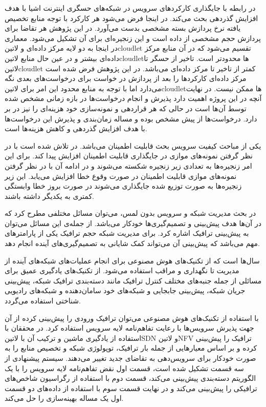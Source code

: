  در رابطه با جایگذاری کارکردهای سرویس در شبکه‌های حسگری اینترنت اشیا با هدف افزایش گذردهی بحث می‌کند. در اینجا فرض می‌شود هر کارکرد با توجه منابع تخصیص یافته نرخ پردازش بسته مشخصی بدست می‌آورد.
در این پژوهش هر تقاضا برای پردازش حجم مشخصی از داده است و این زنجیره‌ای برای آن تشکیل می‌شود. معماری در اینجا به دو لایه مرکز داده‌ای و ‌لاتین{cloudlet} تقسیم می‌شود که در آن منابع مرکز داده‌ای بیشتر
و در عین حال منابع ‌لاتین{cloudlet}ها محدودتر است. تاخیر از حسگر تا ‌لاتین{cloudlet} کمتر از تاخیر تا مرکز داده‌ای می‌باشد. در این پژوهش فرض شده است مرکز داده‌ای کارکردها را بعد از پردازش
در خواست برای درخواست‌های بعدی نگه می‌دارد اما با توجه به منابع محدود این امر برای ‌لاتین{cloudlet}ها ممکن نیست.
در نهایت آنچه در این پروژه اهمیت دارد پذیرش و انجام درخواست‌ها در بازه زمانی مشخص شده توسط آن‌ها است در حالی که هر قراردهی و نمونه‌سازی خود هزینه‌ای را نیز در بر دارد.
درخواست‌ها از پیش مشخص بوده و مساله زمان‌بندی و پذیرش این درخواست‌ها با هدف افزایش گذردهی و کاهش هزینه‌ها است.

یکی از مباحث کیفیت سرویس بحث قابلیت اطمینان می‌باشد. در  تلاش شده است با در نظر گرفتن نمونه‌های موازی در جایگذاری قابلیت اطمینان افزایش پیدا کند. برای این امر زنجیره‌ها به تعدادی زیر زنجیره شکسته می‌شوند
و در ادامه آن با در نظر گرفتن نمونه‌های موازی قابلیت اطمینان در صورت وقوع خطا افزایش می‌یابد. این زیر زنجیره‌ها به صورت توزیع شده جایگذاری می‌شوند در صورت بروز خطا وابستگی کمتری به یکدیگر داشته باشند.



در بحث مدیریت شبکه و سرویس بدون لمس، می‌توان مسائل مختلفی مطرح کرد که در آن‌ها هدف پیش‌بینی و تصمیم‌گیری‌ها خودکار می‌باشد. از جمله‌ی این مسائل می‌توان به پیش‌بینی ترافیک اشاره کرد.
برای مدیریت شبکه حجم ترافیک یکی از پارامترهای مهم می‌باشد که پیش‌بینی آن می‌تواند کمک شایانی به تصمیم‌گیری‌های آینده انجام دهد.

سال‌ها است که از تکنیک‌های هوش مصنوعی برای انجام عملیات‌های شبکه‌های آینده از مدیریت تا نگهداری و مراقب استفاده می‌شود. از تکنیک‌های یادگیری عمیق
برای مسائلی از جمله جنبه‌های مختلف کنترل ترافیک مانند دسته‌بندی ترافیک شبکه، پیش‌بینی جریان شبکه، پیش‌بینی جابجایی
و شبکه‌های خود سامان‌دهنده و شبکه‌های رادیویی شناختی
استفاده می‌گردد. 

با استفاده از تکنیک‌های هوش مصنوعی می‌توان ترافیک ورودی را پیش‌بینی کرده از آن جهت پذیرش سرویس‌ها با رعایت تفاهم‌نامه لایه سرویس استفاده کرد. 
در  محققان با استفاده از یادگیری ماشین و ترکیب آن با ‌لاتین{SDN} و ‌لاتین{NFV} ترافیک را پیش‌بینی کرده و بر اساس معیارهایی از جمله بار ترافیک،
توپولوژی شبکه و تخصیص منابع را به صورت خودکار برای سرویس‌دهی به تقاضای جدید تغییر می‌دهند. سیستم پیشنهادی  از سه قسمت تشکیل شده است، قسمت اول
نقض تفاهم‌نامه لایه سرویس را با یک الگوریتم دسته‌بندی پیش‌بینی می‌کند، قسمت دوم با استفاده از رگراسیون شاخص‌های ترافیکی را پیش‌بینی می‌کند و در نهایت قسمت سوم با استفاده از
داده‌های دو قسمت اول یک مساله بهینه‌سازی را حل می‌کند.


